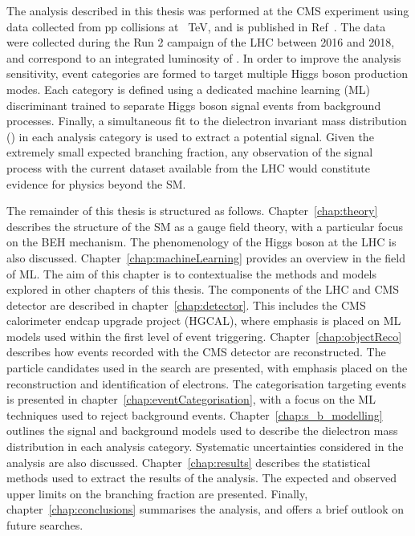 The analysis described in this thesis was performed at the CMS experiment using data collected from pp collisions at \sqrts~TeV, and is published in Ref~\cite{HIG-21-015-PAS}. The data were collected during the Run 2 campaign of the LHC between 2016 and 2018, and correspond to an integrated luminosity of \intlumi. In order to improve the analysis sensitivity, event categories are formed to target multiple Higgs boson production modes. Each category is defined using a dedicated machine learning (ML) discriminant trained to separate Higgs boson signal events from background processes. Finally, a simultaneous fit to the dielectron invariant mass distribution (\mee) in each analysis category is used to extract a potential \Hee signal. Given the extremely small expected branching fraction, any observation of the signal process with the current dataset available from the LHC would constitute evidence for physics beyond the SM.

The remainder of this thesis is structured as follows. Chapter~\ref{chap:theory} describes the structure of the SM as a gauge field theory, with a particular focus on the BEH mechanism. The phenomenology of the Higgs boson at the LHC is also discussed. Chapter~\ref{chap:machineLearning} provides an overview in the field of ML. The aim of this chapter is to contextualise the methods and models explored in other chapters of this thesis. The components of the LHC and CMS detector are described in chapter~\ref{chap:detector}. This includes the CMS calorimeter endcap upgrade project (HGCAL), where emphasis is placed on ML models used within the first level of event triggering. Chapter~\ref{chap:objectReco} describes how events recorded with the CMS detector are reconstructed. The particle candidates used in the \Hee search are presented, with emphasis placed on the reconstruction and identification of electrons. The categorisation targeting \Hee events is presented in chapter~\ref{chap:eventCategorisation}, with a focus on the ML techniques used to reject background events. Chapter~\ref{chap:s_b_modelling} outlines the signal and background models used to describe the dielectron mass distribution in each analysis category. Systematic uncertainties considered in the analysis are also discussed. Chapter~\ref{chap:results} describes the statistical methods used to extract the results of the analysis. The expected and observed upper limits on the \Hee branching fraction are presented. Finally, chapter~\ref{chap:conclusions} summarises the \Hee analysis, and offers a brief outlook on future searches.


